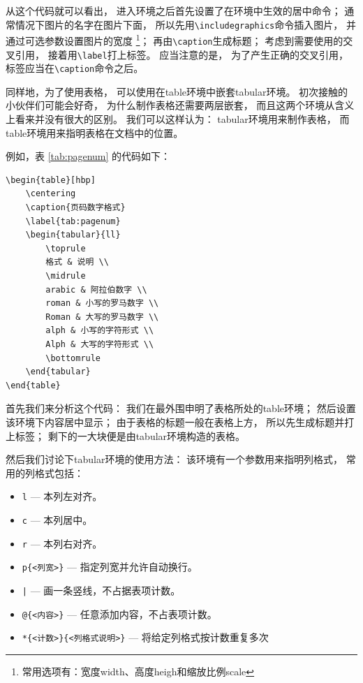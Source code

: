 \documentclass[UTF8]{ctexart}
\numberwithin{equation}{section}			%
\begin{document}
    从这个代码就可以看出，
    进入环境之后首先设置了在环境中生效的居中命令；
    通常情况下图片的名字在图片下面，
    所以先用\verb|\includegraphics|命令插入图片，
    并通过可选参数设置图片的宽度
    \footnote{常用选项有：宽度width、高度heigh和缩放比例scale}；
    再由\verb|\caption|生成标题；
    考虑到需要使用的交叉引用，
    接着用\verb|\label|打上标签。
    应当注意的是，
    为了产生正确的交叉引用，
    标签应当在\verb|\caption|命令之后。
    
    同样地，为了使用表格，
    可以使用在table环境中嵌套tabular环境。
    初次接触的小伙伴们可能会好奇，
    为什么制作表格还需要两层嵌套，
    而且这两个环境从含义上看来并没有很大的区别。
    我们可以这样认为：
    tabular环境用来制作表格，
    而table环境用来指明表格在文档中的位置。

    例如，表 \ref{tab:pagenum} 的代码如下：
    
\begin{lstlisting}
\begin{table}[hbp]
    \centering
    \caption{页码数字格式}
    \label{tab:pagenum}
    \begin{tabular}{ll}
        \toprule
        格式 & 说明 \\
        \midrule
        arabic & 阿拉伯数字 \\
        roman & 小写的罗马数字 \\
        Roman & 大写的罗马数字 \\
        alph & 小写的字符形式 \\
        Alph & 大写的字符形式 \\
        \bottomrule
    \end{tabular}
\end{table}
\end{lstlisting}

    首先我们来分析这个代码：
    我们在最外围申明了表格所处的table环境；
    然后设置该环境下内容居中显示；
    由于表格的标题一般在表格上方，
    所以先生成标题并打上标签；
    剩下的一大块便是由tabular环境构造的表格。
    
    然后我们讨论下tabular环境的使用方法：
    该环境有一个参数用来指明列格式，
    常用的列格式包括：
    
    \begin{itemize}
        \item \verb|l| --- 本列左对齐。
        \item \verb|c| --- 本列居中。
        \item \verb|r| --- 本列右对齐。
        \item \verb|p{<列宽>}| --- 指定列宽并允许自动换行。
        \item \verb=|= --- 画一条竖线，不占据表项计数。
        \item \verb|@{<内容>}| --- 任意添加内容，不占表项计数。
        \item \verb|*{<计数>}{<列格式说明>}| --- 将给定列格式按计数重复多次
    \end{itemize}
\end{document}
